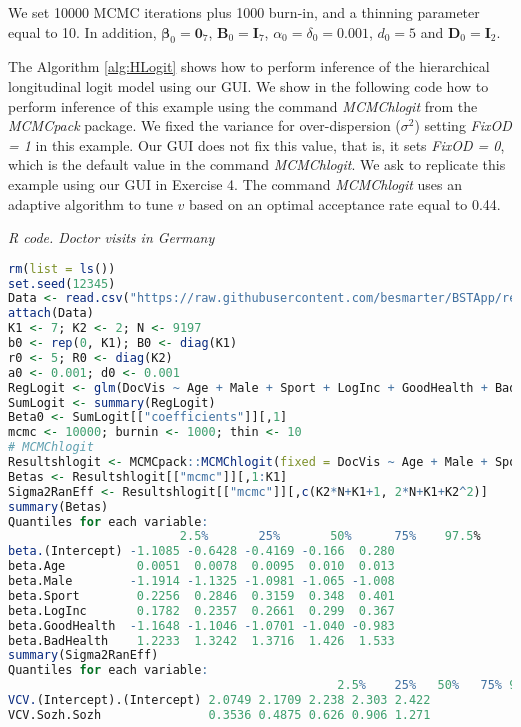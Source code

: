 We set 10000 MCMC iterations plus 1000 burn-in, and a thinning parameter equal to 10. In addition, $\bm{\beta}_0=\bm{0}_7$, $\bm{B}_0=\bm{I}_7$, $\alpha_0=\delta_0=0.001$, $d_0=5$ and $\bm{D}_0=\bm{I}_2$. 

The Algorithm \ref{alg:HLogit} shows how to perform inference of the hierarchical longitudinal logit model using our GUI. We show in the following code how to perform inference of this example using the command \textit{MCMChlogit} from the \textit{MCMCpack} package. We fixed the variance for over-dispersion ($\sigma^2$) setting \textit{FixOD = 1} in this example. Our GUI does not fix this value, that is, it sets \textit{FixOD = 0}, which is the default value in the command \textit{MCMChlogit}. We ask to replicate this example using our GUI in Exercise 4. The command \textit{MCMChlogit} uses an adaptive algorithm to tune $v$ based on an optimal acceptance rate equal to 0.44. 

\begin{tcolorbox}[enhanced,width=4.67in,center upper,
	fontupper=\large\bfseries,drop shadow southwest,sharp corners]
	\textit{R code. Doctor visits in Germany}
	\begin{VF}
		\begin{lstlisting}[language=R]
rm(list = ls())
set.seed(12345)
Data <- read.csv("https://raw.githubusercontent.com/besmarter/BSTApp/refs/heads/master/DataApp/9VisitDoc.csv", sep = ",", header = TRUE, quote = "")
attach(Data)
K1 <- 7; K2 <- 2; N <- 9197
b0 <- rep(0, K1); B0 <- diag(K1)
r0 <- 5; R0 <- diag(K2)
a0 <- 0.001; d0 <- 0.001
RegLogit <- glm(DocVis ~ Age + Male + Sport + LogInc + GoodHealth + BadHealth, family = binomial(link = "logit"))
SumLogit <- summary(RegLogit)
Beta0 <- SumLogit[["coefficients"]][,1]
mcmc <- 10000; burnin <- 1000; thin <- 10
# MCMChlogit
Resultshlogit <- MCMCpack::MCMChlogit(fixed = DocVis ~ Age + Male + Sport + LogInc + GoodHealth + BadHealth, random = ~Sozh, group="id", data = Data, burnin = burnin, mcmc = mcmc, thin = thin, mubeta = b0, Vbeta = B0, r = r0, R = R0, nu = a0, delta = d0, beta.start = Beta0, FixOD = 1)
Betas <- Resultshlogit[["mcmc"]][,1:K1]
Sigma2RanEff <- Resultshlogit[["mcmc"]][,c(K2*N+K1+1, 2*N+K1+K2^2)]
summary(Betas)
Quantiles for each variable:
						2.5%       25%       50%      75%    97.5%
beta.(Intercept) -1.1085 -0.6428 -0.4169 -0.166  0.280
beta.Age          0.0051  0.0078  0.0095  0.010  0.013
beta.Male        -1.1914 -1.1325 -1.0981 -1.065 -1.008
beta.Sport        0.2256  0.2846  0.3159  0.348  0.401
beta.LogInc       0.1782  0.2357  0.2661  0.299  0.367
beta.GoodHealth  -1.1648 -1.1046 -1.0701 -1.040 -0.983
beta.BadHealth    1.2233  1.3242  1.3716  1.426  1.533
summary(Sigma2RanEff)
Quantiles for each variable:
								              2.5%    25%   50%   75% 97.5%
VCV.(Intercept).(Intercept) 2.0749 2.1709 2.238 2.303 2.422
VCV.Sozh.Sozh               0.3536 0.4875 0.626 0.906 1.271
\end{lstlisting}
	\end{VF}
\end{tcolorbox}

